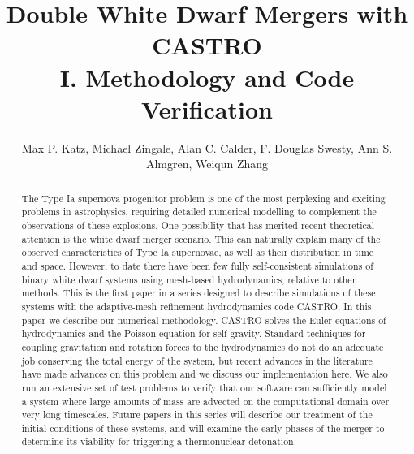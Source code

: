 \documentclass[iop]{emulateapj}
\begin{document}
\title{Double White Dwarf Mergers with CASTRO\\ I. Methodology and Code 
       Verification}


\author{Max P. Katz, Michael Zingale, Alan C. Calder, F. Douglas Swesty, Ann S. Almgren, Weiqun Zhang}
\begin{abstract}
The Type Ia supernova progenitor problem is one of the most perplexing and 
exciting problems in astrophysics, requiring detailed numerical modelling to 
complement the observations of these explosions. One possibility that has 
merited recent theoretical attention is the white dwarf merger scenario.
This can naturally explain many of the observed characteristics of 
Type Ia supernovae, as well as their distribution in time and space.
However, to date there have been few fully self-consistent simulations 
of binary white dwarf systems using mesh-based hydrodynamics, 
relative to other methods. This is the first paper in a series designed to 
describe simulations of these systems with the adaptive-mesh refinement 
hydrodynamics code CASTRO. In this paper we describe our numerical 
methodology. CASTRO solves the Euler equations of hydrodynamics 
and the Poisson equation for self-gravity. Standard techniques for 
coupling gravitation and rotation forces to the hydrodynamics do 
not do an adequate job conserving the total energy of the system, 
but recent advances in the literature have made advances on this 
problem and we discuss our implementation here. We also run an 
extensive set of test problems to verify that our software can sufficiently
model a system where large amounts of mass are advected on the computational 
domain over very long timescales. Future papers in this series will describe
our treatment of the initial conditions of these systems, and will 
examine the early phases of the merger to determine its viability
for triggering a thermonuclear detonation.

\end{abstract}

\end{document}
